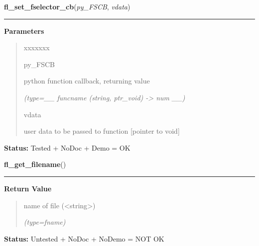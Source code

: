 \hspace{.8\funcindent}\begin{boxedminipage}{\funcwidth}

    \raggedright \textbf{fl\_set\_fselector\_cb}(\textit{py\_FSCB}, \textit{vdata})

    \vspace{-1.5ex}

    \rule{\textwidth}{0.5\fboxrule}
\setlength{\parskip}{2ex}
\setlength{\parskip}{1ex}
      \textbf{Parameters}
      \vspace{-1ex}

      \begin{quote}
        \begin{Ventry}{xxxxxxx}

          \item[py\_FSCB]

          python function callback, returning value

            {\it (type=\_\_ funcname (string, ptr\_void) -{\textgreater} num \_\_)}

          \item[vdata]

          user data to be passed to function [pointer to void]

        \end{Ventry}

      \end{quote}

\textbf{Status:} Tested + NoDoc + Demo = OK



    \end{boxedminipage}

    \label{xformslib:library:fl_get_filename}

    \vspace{0.5ex}

\hspace{.8\funcindent}\begin{boxedminipage}{\funcwidth}

    \raggedright \textbf{fl\_get\_filename}()

    \vspace{-1.5ex}

    \rule{\textwidth}{0.5\fboxrule}
\setlength{\parskip}{2ex}
\setlength{\parskip}{1ex}
      \textbf{Return Value}
    \vspace{-1ex}

      \begin{quote}
      name of file ({\textless}string{\textgreater})

      {\it (type=fname)}

      \end{quote}

\textbf{Status:} Untested + NoDoc + NoDemo = NOT OK



    \end{boxedminipage}

